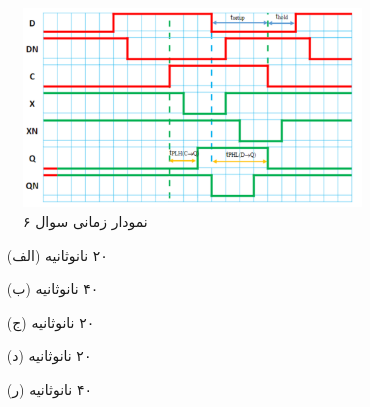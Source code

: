 

\begin{figure}[h]
	\centering
	\includegraphics[width=0.8\textwidth]{fig/Q6.png}
	\caption{نمودار زمانی سوال ۶}
	\label{Q6_Design}
\end{figure}

\begin{enumerate}
	\item [(الف)]
	۲۰ نانوثانیه
	
	\item [(ب)]
	۴۰ نانوثانیه
	
	\item [(ج)]
	۲۰ نانوثانیه
	
	\item [(د)]
	۲۰ نانوثانیه
	
	\item [(ر)]
	۴۰ نانوثانیه
\end{enumerate}